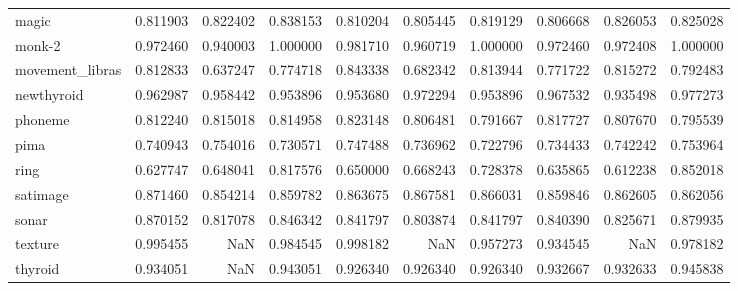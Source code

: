 \begin{tabular}{lrrrrrrrrr}
magic           &             0.811903 &             0.822402 &            0.838153 &              0.810204 &              0.805445 &             0.819129 &      0.806668 &      0.826053 &     0.825028 \\
monk-2          &             0.972460 &             0.940003 &            1.000000 &              0.981710 &              0.960719 &             1.000000 &      0.972460 &      0.972408 &     1.000000 \\
movement\_libras &             0.812833 &             0.637247 &            0.774718 &              0.843338 &              0.682342 &             0.813944 &      0.771722 &      0.815272 &     0.792483 \\
newthyroid      &             0.962987 &             0.958442 &            0.953896 &              0.953680 &              0.972294 &             0.953896 &      0.967532 &      0.935498 &     0.977273 \\
phoneme         &             0.812240 &             0.815018 &            0.814958 &              0.823148 &              0.806481 &             0.791667 &      0.817727 &      0.807670 &     0.795539 \\
pima            &             0.740943 &             0.754016 &            0.730571 &              0.747488 &              0.736962 &             0.722796 &      0.734433 &      0.742242 &     0.753964 \\
ring            &             0.627747 &             0.648041 &            0.817576 &              0.650000 &              0.668243 &             0.728378 &      0.635865 &      0.612238 &     0.852018 \\
satimage        &             0.871460 &             0.854214 &            0.859782 &              0.863675 &              0.867581 &             0.866031 &      0.859846 &      0.862605 &     0.862056 \\
sonar           &             0.870152 &             0.817078 &            0.846342 &              0.841797 &              0.803874 &             0.841797 &      0.840390 &      0.825671 &     0.879935 \\
texture         &             0.995455 &                  NaN &            0.984545 &              0.998182 &                   NaN &             0.957273 &      0.934545 &           NaN &     0.978182 \\
thyroid         &             0.934051 &                  NaN &            0.943051 &              0.926340 &              0.926340 &             0.926340 &      0.932667 &      0.932633 &     0.945838 \\

\end{tabular}
